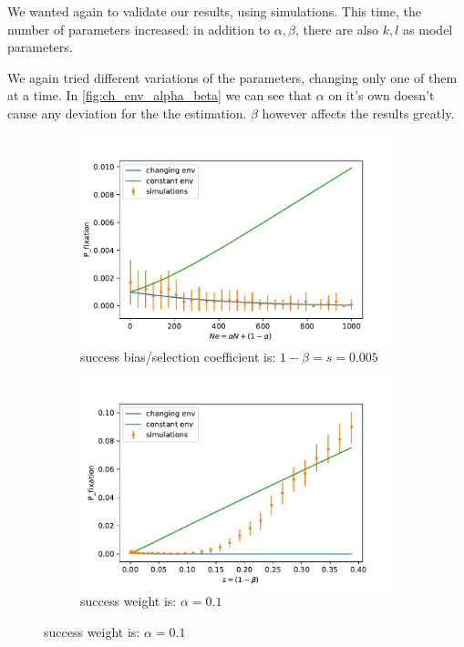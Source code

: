 \documentclass[12pt]{extarticle}
\begin{document}
We wanted again to validate our results, using simulations.
This time, the number of parameters increased: in addition to $\alpha,\beta$, there are also $k,l$ as model parameters.

We again tried different variations of the parameters, changing only one of them at a time.
In \cref{fig:ch_env_alpha_beta} we can see that $\alpha$ on it's own doesn't cause any deviation for the the estimation. $\beta$ however affects the results greatly.

\begin{figure}[t]
  \begin{center}
  \begin{subfigure}[a]{0.49\linewidth}
  \caption{success bias/selection coefficient is: $1-\beta=s=0.005$}
    \includegraphics[width=\linewidth]{../figures/changed_env/ch_env_var_alpha.pdf}
   \end{subfigure}
   \begin{subfigure}[a]{0.49\linewidth}
   \caption{success weight is: $\alpha=0.1$}
    \includegraphics[width=\linewidth]{../figures/changed_env/ch_env_var_beta.pdf}

\end{subfigure}
\end{center}
\end{figure}
\end{document}
